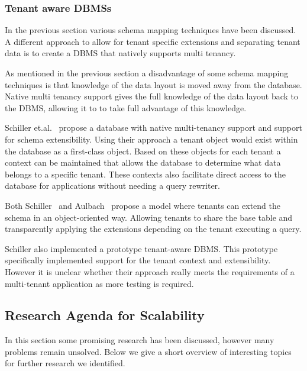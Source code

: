 \subsubsection{Tenant aware \acp{DBMS}}
In the previous section various schema mapping techniques have been discussed.
A different approach to allow for tenant specific extensions and separating tenant data is to create a \ac{DBMS} that natively supports multi tenancy.

As mentioned in the previous section a disadvantage of some schema mapping techniques is that knowledge of the data layout is moved away from the database.
Native multi tenancy support gives the full knowledge of the data layout back to the \ac{DBMS}, allowing it to to take full advantage of this knowledge.~\cite{schiller2011native}

Schiller et.al.~\cite{schiller2011native} propose a database with native multi-tenancy support and support for schema extensibility.
Using their approach a tenant object would exist within the database as a first-class object. 
Based on these objects for each tenant a context can be maintained that allows the database to determine what data belongs to a specific tenant. 
These contexts also facilitate direct access to the database for applications without needing a query rewriter.

Both Schiller~\cite{schiller2011native} and Aulbach~\cite{aulbach2011extensibility} propose a model where tenants can extend the schema in an object-oriented way.
Allowing tenants to share the base table and transparently applying the extensions depending on the tenant executing a query.

Schiller also implemented a prototype tenant-aware \ac{DBMS}.
This prototype specifically implemented support for the tenant context and extensibility.
However it is unclear whether their approach really meets the requirements of a multi-tenant application as more testing is required.


\subsection{Research Agenda for Scalability}
In this section some promising research has been discussed, however many problems remain unsolved.
Below we give a short overview of interesting topics for further research we identified.

